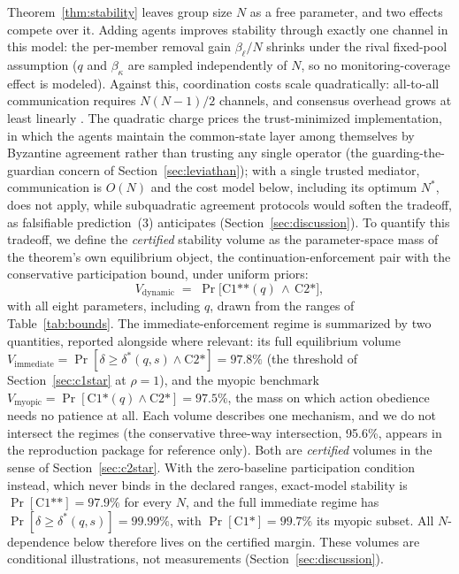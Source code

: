 \documentclass[manuscript,screen,review]{jair}
\newcommand{\Vmyopic}{97.5\%}          %
\newcommand{\Vimmediate}{97.8\%}       %
\newcommand{\Vcross}{95.6\%}           %
\newcommand{\VCOneDyn}{97.9\%}         %
\newcommand{\VCOne}{99.7\%}            %
\begin{document}
Theorem~\ref{thm:stability} leaves group size $N$ as a free parameter, and two effects compete over it. Adding agents improves stability through exactly one channel in this model: the per-member removal gain $\beta_\ell/N$ shrinks under the rival fixed-pool assumption ($q$ and $\beta_\kappa$ are sampled independently of $N$, so no monitoring-coverage effect is modeled). Against this, coordination costs scale quadratically: all-to-all communication requires $N(N{-}1)/2$ channels, and consensus overhead grows at least linearly \cite{lamport.paxos.2001,castro.liskov.1999}. The quadratic charge prices the trust-minimized implementation, in which the agents maintain the common-state layer among themselves by Byzantine agreement rather than trusting any single operator (the guarding-the-guardian concern of Section~\ref{sec:leviathan}); with a single trusted mediator, communication is $O(N)$ and the cost model below, including its optimum $N^*$, does not apply, while subquadratic agreement protocols would soften the tradeoff, as falsifiable prediction~(3) anticipates (Section~\ref{sec:discussion}). To quantify this tradeoff, we define the \emph{certified} stability volume as the parameter-space mass of the theorem's own equilibrium object, the continuation-enforcement pair with the conservative participation bound, under uniform priors:
\begin{equation}
V_{\mathrm{dynamic}} \;=\; \Pr\bigl[\text{C1**}(q) \,\land\, \text{C2*}\bigr] ,
\label{eq:v_dynamic}
\end{equation}
with all eight parameters, including $q$, drawn from the ranges of Table~\ref{tab:bounds}. The immediate-enforcement regime is summarized by two quantities, reported alongside where relevant: its full equilibrium volume $V_{\mathrm{immediate}} = \Pr[\delta \geq \delta^*(q,s) \land \text{C2*}] = \Vimmediate{}$ (the threshold of Section~\ref{sec:c1star} at $\rho = 1$), and the myopic benchmark $V_{\mathrm{myopic}} = \Pr[\text{C1*}(q) \land \text{C2*}] = \Vmyopic{}$, the mass on which action obedience needs no patience at all. Each volume describes one mechanism, and we do not intersect the regimes (the conservative three-way intersection, \Vcross{}, appears in the reproduction package for reference only). Both are \emph{certified} volumes in the sense of Section~\ref{sec:c2star}. With the zero-baseline participation condition instead, which never binds in the declared ranges, exact-model stability is $\Pr[\text{C1**}] = \VCOneDyn{}$ for every $N$, and the full immediate regime has $\Pr[\delta \geq \delta^*(q,s)] = 99.99\%$, with $\Pr[\text{C1*}] = \VCOne{}$ its myopic subset. All $N$-dependence below therefore lives on the certified margin. These volumes are conditional illustrations, not measurements (Section~\ref{sec:discussion}).
\end{document}
